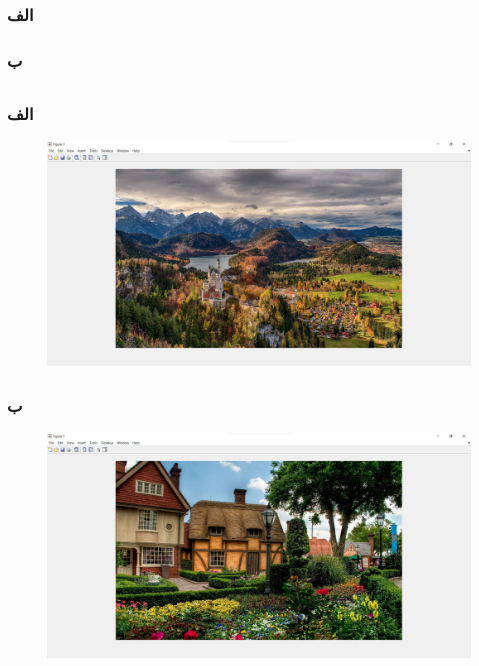 \documentclass{article}
\begin{document}
\subsection{}
\subsubsection{الف}
\begin{latin}

\end{latin}
\subsubsection{ب}
\begin{latin}

\end{latin}

\subsection{}
\subsubsection{الف}
\begin{figure}[H]
    \centering
    \includegraphics[width=1.0\textwidth]{figures/p3a.jpg}
    \caption
	{}
    \label{fig:fig1}
\end{figure}

\subsubsection{ب}
\begin{figure}[H]
    \centering
    \includegraphics[width=1.0\textwidth]{figures/p3b.jpg}
    \caption
	{}
    \label{fig:fig1}
\end{figure}
\end{document}
